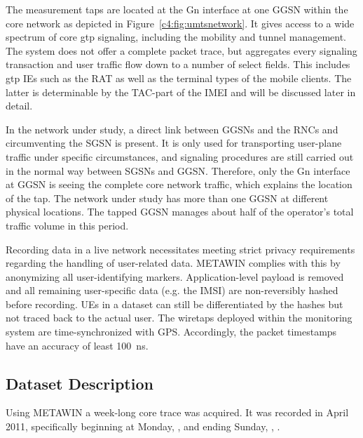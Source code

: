 The measurement taps are located at the Gn interface at one \gls{GGSN} within the core network as depicted in Figure~\ref{c4:fig:umtsnetwork}. It gives access to a wide spectrum of core \gls{gtp} signaling, including the mobility and tunnel management. The system does not offer a complete packet trace, but aggregates every signaling transaction and user traffic flow down to a number of select fields. This includes \gls{gtp} \glspl{IE} such as the \gls{RAT} as well as the terminal types of the mobile clients. The latter is determinable by the \acrshort{TAC}-part of the \gls{IMEI} and will be discussed later in detail.

In the network under study, a direct link between \glspl{GGSN} and the \glspl{RNC} and circumventing the \gls{SGSN} is present. It is only used for transporting user-plane traffic under specific circumstances, and signaling procedures are still carried out in the normal way between \glspl{SGSN} and \gls{GGSN}. Therefore, only the Gn interface at \gls{GGSN} is seeing the complete core network traffic, which explains the location of the tap. The network under study has more than one \gls{GGSN} at different physical locations. The tapped \gls{GGSN} manages about half of the operator's total traffic volume in this period. 

Recording data in a live network necessitates meeting strict privacy requirements regarding the handling of user-related data. \acrshort{METAWIN} complies with this by anonymizing all user-identifying markers. Application-level payload is removed and all remaining user-specific data (e.g. the \gls{IMSI}) are non-reversibly hashed before recording. \glspl{UE} in a dataset can still be differentiated by the hashes but not traced back to the actual user. The wiretaps deployed within the monitoring system are time-synchronized with \gls{GPS}. Accordingly, the packet timestamps have an accuracy of least \SI{100}{\nano\second}.


\subsection{Dataset Description}

Using \acrshort{METAWIN} a week-long core trace was acquired. It was recorded in April 2011, specifically beginning at Monday, \yyyymmdddate{},  and ending Sunday, , .

